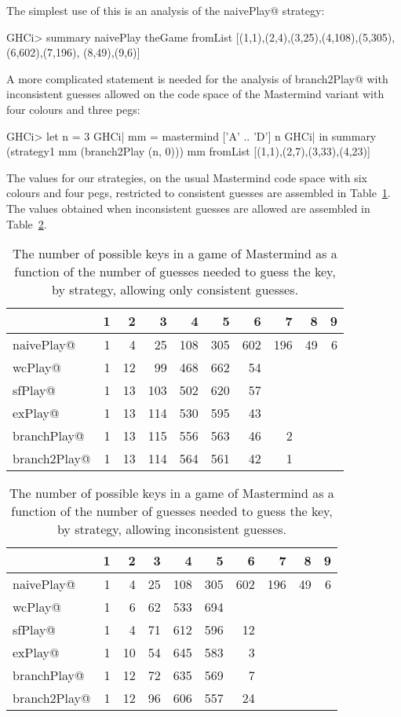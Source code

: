 \documentclass[a4paper]{article}
\makeatletter
\theoremstyle{definition}
\newcommand{\cmd}[1]{\Verb@#1@}
\makeatother
\begin{document}
The simplest use of this is an analysis of the \cmd{naivePlay} strategy:
\begin{cmdsession}
GHCi> summary naivePlay theGame
fromList [(1,1),(2,4),(3,25),(4,108),(5,305),(6,602),(7,196),
          (8,49),(9,6)]
\end{cmdsession}
A more complicated statement is needed for the analysis of \cmd{branch2Play} with inconsistent guesses allowed on the code space of the Mastermind variant with four colours and three pegs:
\begin{cmdsession}
GHCi> let n  = 3
GHCi|     mm = mastermind ['A' .. 'D'] n
GHCi| in summary (strategy1 mm (branch2Play (n, 0))) mm
fromList [(1,1),(2,7),(3,33),(4,23)]
\end{cmdsession}

The values for our strategies, on the usual Mastermind code space with six colours and four pegs, restricted to consistent guesses are assembled in Table~\ref{tab:summaryconsistent}.
The values obtained when inconsistent guesses are allowed are assembled in Table~\ref{tab:summaryinconsistent}.

\begin{table}
\centering
\begin{tabular}{l|rrrrrrrrr}
	& 1	& 2	& 3	& 4	& 5	& 6	& 7	& 8	& 9 \\
\hline
\cmd{naivePlay}	& 1	& 4	& 25	& 108	& 305	& 602	& 196	& 49	& 6 \\
\cmd{wcPlay}	& 1	& 12	& 99	& 468	& 662	& 54	& 	& 	&  \\
\cmd{sfPlay}	& 1	& 13	& 103	& 502	& 620	& 57	& 	& 	&  \\
\cmd{exPlay}	& 1	& 13	& 114	& 530	& 595	& 43	& 	& 	&  \\
\cmd{branchPlay}	& 1	& 13	& 115	& 556	& 563	& 46	& 2	& 	&  \\
\cmd{branch2Play}	& 1	& 13	& 114	& 564	& 561	& 42	& 1	& 	& 
\end{tabular}
\caption{The number of possible keys in a game of Mastermind as a function of the number of guesses needed to guess the key, by strategy, allowing only consistent guesses.}
\label{tab:summaryconsistent}
\end{table}

\begin{table}
\centering
\begin{tabular}{l|rrrrrrrrr}
	& 1	& 2	& 3	& 4	& 5	& 6	& 7	& 8	& 9 \\
\hline
\cmd{naivePlay}	& 1	& 4	& 25	& 108	& 305	& 602	& 196	& 49	& 6 \\
\cmd{wcPlay}	& 1	& 6	& 62	& 533	& 694	& 	& 	& 	&  \\
\cmd{sfPlay}	& 1	& 4	& 71	& 612	& 596	& 12	& 	& 	&  \\
\cmd{exPlay}	& 1	& 10	& 54	& 645	& 583	& 3	& 	& 	&  \\
\cmd{branchPlay}	& 1	& 12	& 72	& 635	& 569	& 7	& 	& 	&  \\
\cmd{branch2Play}	& 1	& 12	& 96	& 606	& 557	& 24	& 	& 	& 
\end{tabular}
\caption{The number of possible keys in a game of Mastermind as a function of the number of guesses needed to guess the key, by strategy, allowing inconsistent guesses.}
\label{tab:summaryinconsistent}
\end{table}
\end{document}
